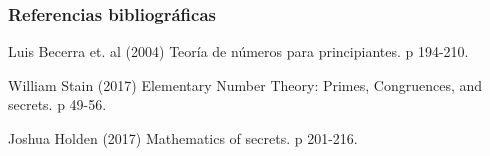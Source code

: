 \documentclass[spanish, mexico]{beamer}
\begin{document}
	\begin{frame}
		\frametitle{Referencias bibliográficas}
		\footnotesize{
		\begin{thebibliography}{1}
			 Luis Becerra et. al (2004)
			\newblock Teoría de números para principiantes.
			\newblock p 194-210.
		\end{thebibliography}
		\begin{thebibliography}{2}
			 William Stain (2017)
			\newblock Elementary Number Theory: Primes, Congruences, and secrets.
			\newblock p 49-56.
		\end{thebibliography}
		\begin{thebibliography}{3}
			 Joshua Holden (2017)
			\newblock Mathematics of secrets.
			\newblock p 201-216.
		\end{thebibliography}	
		}
	\end{frame}
\end{document}
